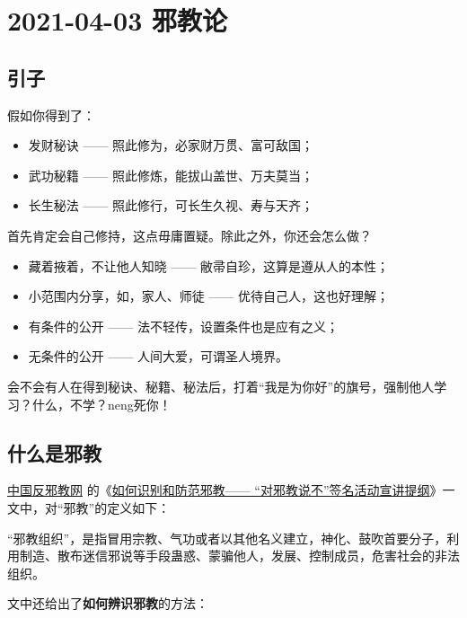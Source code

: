 \section{2021-04-03 邪教论}

\subsection{引子}

假如你得到了：

\begin{itemize}[nosep, left=\parindent]
    \item 发财秘诀 —— 照此修为，必家财万贯、富可敌国；
    \item 武功秘籍 —— 照此修炼，能拔山盖世、万夫莫当；
    \item 长生秘法 —— 照此修行，可长生久视、寿与天齐；
\end{itemize}

首先肯定会自己修持，这点毋庸置疑。除此之外，你还会怎么做？

\begin{itemize}[nosep, left=\parindent]
    \item 藏着掖着，不让他人知晓 —— 敝帚自珍，这算是遵从人的本性；
    \item 小范围内分享，如，家人、师徒 —— 优待自己人，这也好理解；
    \item 有条件的公开 —— 法不轻传，设置条件也是应有之义；
    \item 无条件的公开 —— 人间大爱，可谓圣人境界。
\end{itemize}

会不会有人在得到秘诀、秘籍、秘法后，打着“我是为你好”的旗号，强制他人学习？什么，不学？neng死你！

\subsection{什么是邪教}

\href{http://www.chinafxj.cn/}{中国反邪教网} 的《\href{http://www.chinafxj.cn/c/2020-11-03/1286958.shtml}{如何识别和防范邪教—— “对邪教说不”签名活动宣讲提纲}》一文中，对“邪教”的定义如下：

\begin{screen}
    “邪教组织”，是指冒用宗教、气功或者以其他名义建立，神化、鼓吹首要分子，利用制造、散布迷信邪说等手段蛊惑、蒙骗他人，发展、控制成员，危害社会的非法组织。
\end{screen}

文中还给出了\textbf{如何辨识邪教}的方法：

